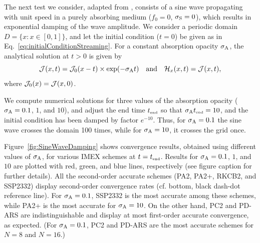 The next test we consider, adapted from \cite{skinnerOstriker_2013}, consists of a sine wave propagating with unit speed in a purely absorbing medium ($f_{0}=0$, $\sigma_{{\rm S}}=0$), which results in exponential damping of the wave amplitude.  
We consider a periodic domain $D=\{x:x\in[0,1]\}$, and let the initial condition ($t=0$) be given as in Eq.~\eqref{eq:initialConditionStreaming}.  
For a constant absorption opacity $\sigma_{{\rm A}}$, the analytical solution at $t>0$ is given by
\begin{equation}
  \mathcal{J}(x,t)=\mathcal{J}_{0}(x-t)\times\exp(-\sigma_{{\rm A}} t)
  \quad\text{and}\quad
  \mathcal{H}_{x}(x,t)=\mathcal{J}(x,t),
\end{equation}
where $\mathcal{J}_{0}(x)=\mathcal{J}(x,0)$.  

We compute numerical solutions for three values of the absorption opacity ($\sigma_{{\rm A}}=0.1$, $1$, and $10$), and adjust the end time $t_{\mbox{\tiny end}}$ so that $\sigma_{{\rm A}}t_{\mbox{\tiny end}}=10$, and the initial condition has been damped by factor $e^{-10}$.  
Thus, for $\sigma_{{\rm A}}=0.1$ the sine wave crosses the domain 100 times, while for $\sigma_{{\rm A}}=10$, it crosses the grid once.  

Figure~\ref{fig:SineWaveDamping} shows convergence results, obtained using different values of $\sigma_{{\rm A}}$, for various IMEX schemes at $t=t_{\mbox{\tiny end}}$.  
Results for $\sigma_{{\rm A}}=0.1$, $1$, and $10$ are plotted with red, green, and blue lines, respectively (see figure caption for further details).  
All the second-order accurate schemes (PA2, PA2+, RKCB2, and SSP2332) display second-order convergence rates (cf. bottom, black dash-dot reference line).  
For $\sigma_{{\rm A}}=0.1$, SSP2332 is the most accurate among these schemes, while PA2+ is the most accurate for $\sigma_{{\rm A}}=10$.  
On the other hand, PC2 and PD-ARS are indistinguishable and display at most first-order accurate convergence, as expected.  
(For $\sigma_{{\rm A}}=0.1$, PC2 and PD-ARS are the most accurate schemes for $N=8$ and $N=16$.)

